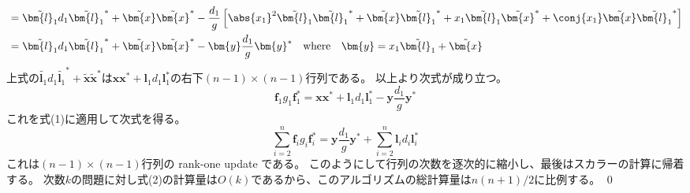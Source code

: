 \begin{derivation*}
\begin{align*}
                &= \tilde{\bm{l}_1}d_1\tilde{\bm{l}_1}^* + \tilde{\bm{x}}\tilde{\bm{x}}^* - \frac{d_1}{g}\left[\abs{x_1}^2\tilde{\bm{l}_1}\tilde{\bm{l}_1}^* + \tilde{\bm{x}}\tilde{\bm{l}_1}^* + x_1\tilde{\bm{l}_1}\tilde{\bm{x}}^* + \conj{x_1}\tilde{\bm{x}}\tilde{\bm{l}_1}^*\right] \\
                &= \tilde{\bm{l}_1}d_1\tilde{\bm{l}_1}^* + \tilde{\bm{x}}\tilde{\bm{x}}^* - \bm{y}\frac{d_1}{g}\bm{y}^* \quad \text{where} \quad \bm{y} = x_1\tilde{\bm{l}_1} + \tilde{\bm{x}}
            \end{align*}
            上式の$\tilde{\bm{l}_1}d_1\tilde{\bm{l}_1}^* + \tilde{\bm{x}}\tilde{\bm{x}}^*$は$\bm{x}\bm{x}^* + \bm{l}_1 d_1\bm{l}_1^*$の右下$(n-1)\times(n-1)$行列である。
            以上より次式が成り立つ。
            \[ \bm{f}_1 g_1\bm{f}_1^* = \bm{x}\bm{x}^* + \bm{l}_1 d_1\bm{l}_1^* - \bm{y}\frac{d_1}{g}\bm{y}^* \]
            これを式(1)に適用して次式を得る。
            \[ \sum_{i=2}^n \bm{f}_i g_i\bm{f}_i^* = \bm{y}\frac{d_1}{g}\bm{y}^* + \sum_{i=2}^n \bm{l}_i d_i\bm{l}_i^* \]
            これは$(n-1)\times(n-1)$行列の rank-one update である。
            このようにして行列の次数を逐次的に縮小し、最後はスカラーの計算に帰着する。
            次数$k$の問題に対し式(2)の計算量は$O(k)$であるから、このアルゴリズムの総計算量は$n(n+1)/2$に比例する。
            \qed
        \end{derivation*}

